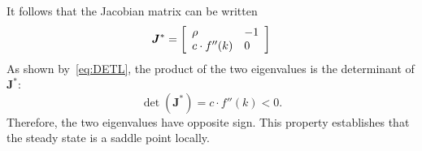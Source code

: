 \documentclass[letterpaper,12pt,leqno]{article}
\begin{document}
It follows that the Jacobian matrix can be written 
\begin{equation*}
\bm{J}^{*}=\left[ 
\begin{array}{ll}
\rho  & -1  \\ 
c\cdot f''(k) & 0
\end{array} \right]
\end{equation*}
As shown by~\eqref{eq:DETL}, the product of the two eigenvalues is the determinant of $\bm{J}^{*}$:  \[\det(\bm{J}^{*})=c\cdot f''(k) <0.\] Therefore, the two eigenvalues have opposite sign. This property establishes that the steady state is a saddle point locally.
\end{document}
